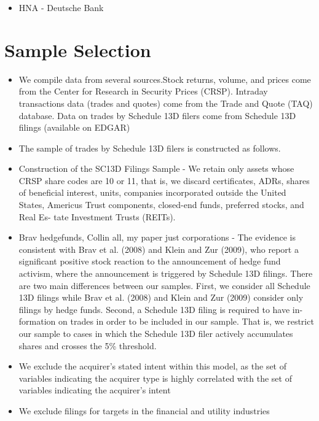 \documentclass[12pt]{article}
\begin{document}
    \begin{itemize}
        \item HNA - Deutsche Bank
    \end{itemize}

\section{Sample Selection}

    \begin{itemize}
        \item We compile data from several sources.Stock returns, volume, and prices come from the Center for Research in Security Prices (CRSP). Intraday transactions data (trades and quotes) come from the Trade and Quote (TAQ) database. Data on trades by Schedule 13D filers come from Schedule 13D filings (available on EDGAR) \citet{Collin-Dufresne2015}
        \item The sample of trades by Schedule 13D filers is constructed as follows.\citet{Collin-Dufresne2015}
        \item Construction of the SC13D Filings Sample - We retain only assets whose CRSP share codes are 10 or 11, that is, we discard certificates, ADRs, shares of beneficial interest, units, companies incorporated outside the United States, Americus Trust components, closed-end funds, preferred stocks, and Real Es- tate Investment Trusts (REITs).\citet{Collin-Dufresne2015}
        \item Brav hedgefunds, Collin all, my paper just corporations - The evidence is consistent with Brav et al. (2008) and Klein and Zur (2009), who report a significant positive stock reaction to the announcement of hedge fund activism, where the announcement is triggered by Schedule 13D filings. There are two main differences between our samples. First, we consider all Schedule 13D filings while Brav et al. (2008) and Klein and Zur (2009) consider only filings by hedge funds. Second, a Schedule 13D filing is required to have in- formation on trades in order to be included in our sample. That is, we restrict our sample to cases in which the Schedule 13D filer actively accumulates shares and crosses the 5\% threshold.\citet{Collin-Dufresne2015}
        \item We exclude the acquirer’s stated intent within this model, as the set of variables indicating the acquirer type is highly correlated with the set of variables indicating the acquirer’s intent \citet{Brigida2012}
        \item We exclude filings for targets in the financial and utility industries \citet{Brigida2012}

\end{itemize}
\end{document}
